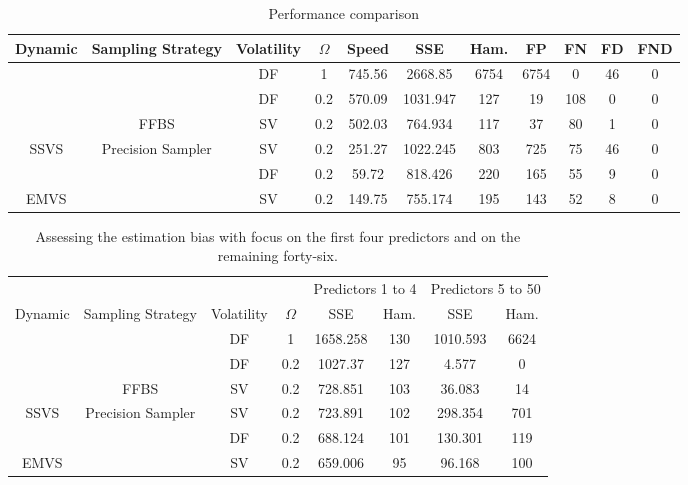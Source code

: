 \documentclass[
  12pt,
]{book}
\theoremstyle{break}
\theoremstyle{nonumberplain}
\begin{document}
\begin{table}[H]

\caption{\label{tab:mytab1}Performance comparison}
\centering
\fontsize{10}{12}\selectfont
\begin{tabular}[t]{>{}ccccccccccc}
\toprule
Dynamic & Sampling Strategy & Volatility & $\Omega$ & Speed & SSE & Ham. & FP & FN & FD & FND\\
\midrule
 &  & DF & 1 & 745.56 & 2668.85 & 6754 & 6754 & 0 & 46 & 0\\
\cmidrule{3-11}
 &  & DF & 0.2 & 570.09 & 1031.947 & 127 & 19 & 108 & 0 & 0\\
\cmidrule{3-11}
 & \multirow[t]{-3}{*}{\centering\arraybackslash FFBS} & SV & 0.2 & 502.03 & 764.934 & 117 & 37 & 80 & 1 & 0\\
\cmidrule{2-11}
\multirow[t]{-4}{*}{\centering\arraybackslash SSVS} & Precision Sampler & SV & 0.2 & 251.27 & 1022.245 & 803 & 725 & 75 & 46 & 0\\
\cmidrule{1-11}
 &  & DF & 0.2 & 59.72 & 818.426 & 220 & 165 & 55 & 9 & 0\\
\cmidrule{3-11}
\multirow[t]{-2}{*}{\centering\arraybackslash EMVS} & \multirow[t]{-2}{*}{\centering\arraybackslash } & SV & 0.2 & 149.75 & 755.174 & 195 & 143 & 52 & 8 & 0\\
\bottomrule
\end{tabular}
\end{table}

\begin{table}[H]

\caption{\label{tab:mytab2}Assessing the estimation bias with focus on the first four predictors and on the remaining forty-six.}
\centering
\fontsize{10}{12}\selectfont
\begin{tabular}[t]{>{}cccccccc}
\toprule
\multicolumn{1}{c}{ } & \multicolumn{1}{c}{ } & \multicolumn{1}{c}{ } & \multicolumn{1}{c}{ } & \multicolumn{2}{c}{Predictors 1 to 4} & \multicolumn{2}{c}{Predictors 5 to 50} \\
\cmidrule(l{3pt}r{3pt}){5-6} \cmidrule(l{3pt}r{3pt}){7-8}
Dynamic & Sampling Strategy & Volatility & $\Omega$ & SSE & Ham. & SSE & Ham.\\
\midrule
 &  & DF & 1 & 1658.258 & 130 & 1010.593 & 6624\\
\cmidrule{3-8}
 &  & DF & 0.2 & 1027.37 & 127 & 4.577 & 0\\
\cmidrule{3-8}
 & \multirow[t]{-3}{*}{\centering\arraybackslash FFBS} & SV & 0.2 & 728.851 & 103 & 36.083 & 14\\
\cmidrule{2-8}
\multirow[t]{-4}{*}{\centering\arraybackslash SSVS} & Precision Sampler & SV & 0.2 & 723.891 & 102 & 298.354 & 701\\
\cmidrule{1-8}
 &  & DF & 0.2 & 688.124 & 101 & 130.301 & 119\\
\cmidrule{3-8}
\multirow[t]{-2}{*}{\centering\arraybackslash EMVS} & \multirow[t]{-2}{*}{\centering\arraybackslash } & SV & 0.2 & 659.006 & 95 & 96.168 & 100\\
\bottomrule
\end{tabular}
\end{table}
\end{document}
